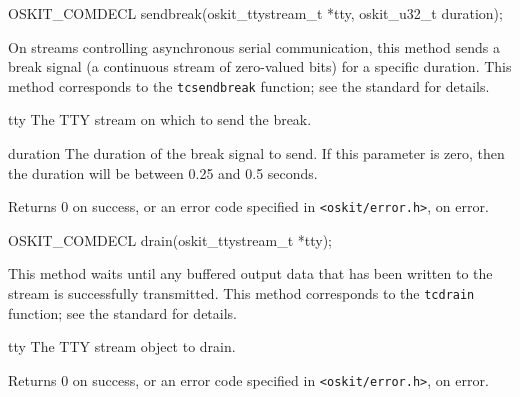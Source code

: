 \begin{apisyn}

	\funcproto OSKIT_COMDECL
	sendbreak(oskit_ttystream_t *tty, oskit_u32_t duration);
\end{apisyn}
\begin{apidesc}
	On streams controlling asynchronous serial communication,
	this method sends a break signal
	(a continuous stream of zero-valued bits)
	for a specific duration.
	This method corresponds to the \posix{} \texttt{tcsendbreak} function;
	see the \posix{} standard for details.
\end{apidesc}
\begin{apiparm}
	\item[tty]
		The TTY stream on which to send the break.
	\item[duration]
		The duration of the break signal to send.
		If this parameter is zero,
		then the duration will be
		between 0.25 and 0.5 seconds.
\end{apiparm}
\begin{apiret}
	Returns 0 on success, or an error code specified in
	{\tt <oskit/error.h>}, on error.
\end{apiret}

\begin{apisyn}

	\funcproto OSKIT_COMDECL
	drain(oskit_ttystream_t *tty);
\end{apisyn}
\begin{apidesc}
	This method waits until any buffered output data
	that has been written to the stream
	is successfully transmitted.
	This method corresponds to the \posix{} \texttt{tcdrain} function;
	see the \posix{} standard for details.
\end{apidesc}
\begin{apiparm}
	\item[tty]
		The TTY stream object to drain.
\end{apiparm}
\begin{apiret}
	Returns 0 on success, or an error code specified in
	{\tt <oskit/error.h>}, on error.
\end{apiret}

